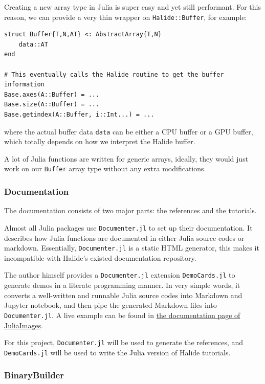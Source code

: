 \documentclass{article}
\begin{document}
Creating a new array type in Julia is super easy and yet still performant. For this reason, we can provide a very thin wrapper on \lstinline{Halide::Buffer}, for example:

\begin{lstlisting}[language=JuliaLocal]
struct Buffer{T,N,AT} <: AbstractArray{T,N}
    data::AT
end

# This eventually calls the Halide routine to get the buffer information
Base.axes(A::Buffer) = ...
Base.size(A::Buffer) = ...
Base.getindex(A::Buffer, i::Int...) = ...
\end{lstlisting}

where the actual buffer data \lstinline{data} can be either a CPU buffer or a GPU buffer, which totally depends on how we interpret the Halide buffer.

A lot of Julia functions are written for generic arrays, ideally, they would just work on our \lstinline{Buffer} array type without any extra modifications.

\subsubsection{Documentation}

The documentation consists of two major parts: the references and the tutorials.

Almost all Julia packages use \lstinline{Documenter.jl} to set up their documentation. It describes how Julia functions are documented in either Julia source codes or markdown. Essentially, \lstinline{Documenter.jl} is a static HTML generator, this makes it incompatible with Halide's existed documentation repository.

The author himself provides a \lstinline{Documenter.jl} extension \lstinline{DemoCards.jl} to generate demos in a literate programming manner. In very simple words, it converts a well-written and runnable Julia source codes into Markdown and Jupyter notebook, and then pipe the generated Markdown files into \lstinline{Documenter.jl}. A live example can be found in \href{https://juliaimages.org/v0.23/democards/examples/}{the documentation page of JuliaImages}.

For this project, \lstinline{Documenter.jl} will be used to generate the references, and \lstinline{DemoCards.jl} will be used to write the Julia version of Halide tutorials.

\subsubsection{BinaryBuilder}
\end{document}
